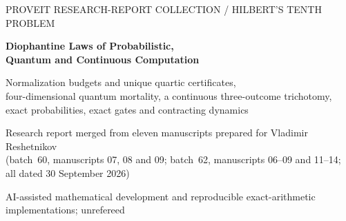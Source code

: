 \documentclass[11pt,letterpaper]{article}
\numberwithin{equation}{section}
\theoremstyle{definition}
\theoremstyle{remark}
\newcommand{\wtag}{\textup{[write]}}
\begin{document}
\hypersetup{pageanchor=false}
\begin{titlepage}
\centering
{\small PROVEIT RESEARCH-REPORT COLLECTION \quad / \quad HILBERT'S TENTH PROBLEM\par}
\vspace{0.5cm}
{\LARGE\bfseries Diophantine Laws of Probabilistic,\\[0.15cm]
Quantum and Continuous Computation\par}
\vspace{0.45cm}
{\large Normalization budgets and unique quartic certificates,\\
four-dimensional quantum mortality,
a continuous three-outcome trichotomy,\\
exact probabilities, exact gates and contracting dynamics\par}
\vspace{0.6cm}
{\normalsize Research report merged from eleven manuscripts prepared for
Vladimir Reshetnikov\\ (batch~60, manuscripts 07, 08 and 09; batch~62,
manuscripts 06--09 and 11--14; all dated 30 September 2026)\par}
{\small AI-assisted mathematical development and reproducible
exact-arithmetic implementations; unrefereed\par}
\vspace{0.3cm}
\begin{minipage}{0.96\textwidth}
\begin{abstract}
\footnotesize
\wtag\ Which quantitative assertions about computation that is
\emph{not} a plain discrete execution log admit finite natural-number
witnesses of integer polynomials? Part~I (manuscript 08, the base text)
represents the output law of every effective probabilistic or quantum
program as the dyadic mass of a prefix-free projection of one fixed quartic
zero set; determines the exact mass budget of a prescribed history of
normalized output laws, the product of the successive largest coordinate
ratios; compiles its feasibility into an explicit quartic with
$5Nm+m+4N+3$ natural witnesses and exactly one witness per valid feasible
input; and proves that normalized two-outcome probabilities with any
success floor below one are exactly the weakly computable reals, whereas
strict conditional comparisons are $\Sigma^0_2$-complete.
Part~II adds exact Clifford+$T$ arithmetic and an operator-valued budget
(08), and (manuscript 07) a rational Gram-packing construction under which
deciding whether a seven-outcome rational quantum instrument in dimension
four has an impossible outcome word is undecidable, given Neary's

\end{abstract}
\end{minipage}
\end{titlepage}
\end{document}
